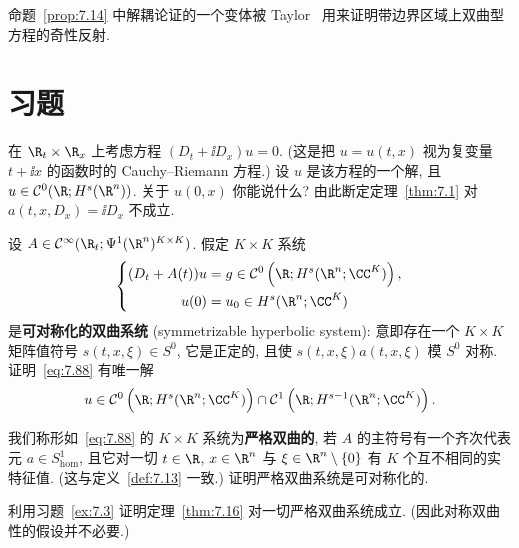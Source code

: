命题~\ref{prop:7.14} 中解耦论证的一个变体被 Taylor~\cite{Tay75} 用来证明带边界区域上双曲型方程的奇性反射.

\section*{习题}

\begin{exer}[对称性假设的必要性]\label{ex:7.1}
在 $\R_t \times \R_x$ 上考虑方程 $(D_t + \ii D_x)u = 0$. (这是把 $u = u(t, x)$ 视为复变量 $t + \ii x$ 的函数时的 Cauchy--Riemann 方程.) 设 $u$ 是该方程的一个解, 且 $u \in \mathcal{C}^0(\R; H^s(\R^n))$. 关于 $u(0, x)$ 你能说什么? 由此断定定理~\ref{thm:7.1} 对 $a(t, x, D_x) = \ii D_x$ 不成立.
\end{exer}

\begin{exer}[可对称化的双曲系统]\label{ex:7.2}
设 $A \in \Smooth(\R_t; \Psi^1(\R^n)^{K \times K})$. 假定 $K \times K$ 系统
\begin{equation}\label{eq:7.88}
    \left\{
    \begin{aligned}
        (D_t + A(t)) u &= g \in \mathcal{C}^0\left( \R; H^s(\R^n; \CC^K) \right), \\
        u(0) &= u_0 \in H^s(\R^n; \CC^K)
    \end{aligned}
    \right.
\end{equation}
是\textbf{可对称化的双曲系统} (symmetrizable hyperbolic system): 意即存在一个 $K \times K$ 矩阵值符号 $s(t, x, \xi) \in S^0$, 它是正定的, 且使 $s(t, x, \xi)a(t, x, \xi)$ 模 $S^0$ 对称. 证明~\eqref{eq:7.88} 有唯一解
\begin{equation}\label{eq:7.89}
    u \in \mathcal{C}^0\left( \R; H^s(\R^n; \CC^K) \right) \cap \mathcal{C}^1\left( \R; H^{s-1}(\R^n; \CC^K) \right).
\end{equation}
\end{exer}

\begin{exer}[严格双曲系统, I]\label{ex:7.3}
我们称形如~\eqref{eq:7.88} 的 $K \times K$ 系统为\textbf{严格双曲的}, 若 $A$ 的主符号有一个齐次代表元 $a \in S^1_{\mathrm{hom}}$, 且它对一切 $t \in \R$, $x \in \R^n$ 与 $\xi \in \R^n \setminus \{0\}$ 有 $K$ 个互不相同的实特征值. (这与定义~\ref{def:7.13} 一致.) 证明严格双曲系统是可对称化的.
\end{exer}

\begin{exer}[严格双曲系统, II]\label{ex:7.4}
利用习题~\ref{ex:7.3} 证明定理~\ref{thm:7.16} 对一切严格双曲系统成立. (因此对称双曲性的假设并不必要.)
\end{exer}

